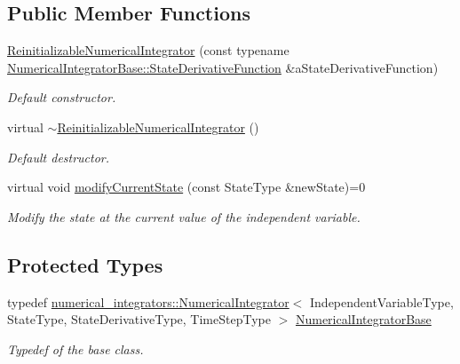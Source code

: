 \subsection*{Public Member Functions}
\begin{DoxyCompactItemize}
\item 
\hyperlink{classtudat_1_1numerical__integrators_1_1ReinitializableNumericalIntegrator_ac48067b658e3213d8cd7c4145dca9338}{Reinitializable\+Numerical\+Integrator} (const typename \hyperlink{classtudat_1_1numerical__integrators_1_1NumericalIntegrator_a0d0a5d48ebaf1f5ad9cd7a73b44be0fc}{Numerical\+Integrator\+Base\+::\+State\+Derivative\+Function} \&a\+State\+Derivative\+Function)\hypertarget{classtudat_1_1numerical__integrators_1_1ReinitializableNumericalIntegrator_ac48067b658e3213d8cd7c4145dca9338}{}\label{classtudat_1_1numerical__integrators_1_1ReinitializableNumericalIntegrator_ac48067b658e3213d8cd7c4145dca9338}

\begin{DoxyCompactList}\small\item\em Default constructor. \end{DoxyCompactList}\item 
virtual \hyperlink{classtudat_1_1numerical__integrators_1_1ReinitializableNumericalIntegrator_ae5c26328c8f3017f136bb5c4bdb72eef}{$\sim$\+Reinitializable\+Numerical\+Integrator} ()\hypertarget{classtudat_1_1numerical__integrators_1_1ReinitializableNumericalIntegrator_ae5c26328c8f3017f136bb5c4bdb72eef}{}\label{classtudat_1_1numerical__integrators_1_1ReinitializableNumericalIntegrator_ae5c26328c8f3017f136bb5c4bdb72eef}

\begin{DoxyCompactList}\small\item\em Default destructor. \end{DoxyCompactList}\item 
virtual void \hyperlink{classtudat_1_1numerical__integrators_1_1ReinitializableNumericalIntegrator_a1e5577a5f0e02218ff8974564dee19b5}{modify\+Current\+State} (const State\+Type \&new\+State)=0
\begin{DoxyCompactList}\small\item\em Modify the state at the current value of the independent variable. \end{DoxyCompactList}\end{DoxyCompactItemize}
\subsection*{Protected Types}
\begin{DoxyCompactItemize}
\item 
typedef \hyperlink{classtudat_1_1numerical__integrators_1_1NumericalIntegrator}{numerical\+\_\+integrators\+::\+Numerical\+Integrator}$<$ Independent\+Variable\+Type, State\+Type, State\+Derivative\+Type, Time\+Step\+Type $>$ \hyperlink{classtudat_1_1numerical__integrators_1_1ReinitializableNumericalIntegrator_a156664f177b4a65af665415ed5b7f9e2}{Numerical\+Integrator\+Base}
\begin{DoxyCompactList}\small\item\em Typedef of the base class. \end{DoxyCompactList}\end{DoxyCompactItemize}
